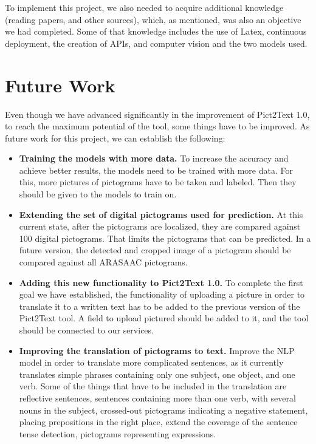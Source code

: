 To implement this project, we also needed to acquire additional knowledge (reading papers, and other sources), which, as mentioned, was also an objective we had completed. Some of that knowledge includes the use of Latex, continuous deployment, the creation of APIs, and computer vision and the two models used.

\section{Future Work}
\label{Future Work}

Even though we have advanced significantly in the improvement of Pict2Text 1.0, to reach the maximum potential of the tool, some things have to be improved. As future work for this project, we can establish the following:

\begin{itemize}
\item \textbf{Training the models with more data.} To increase the accuracy and achieve better results, the models need to be trained with more data. For this, more pictures of pictograms have to be taken and labeled. Then they should be given to the models to train on.
\item \textbf{Extending the set of digital pictograms used for prediction.} At this current state, after the pictograms are localized, they are compared against 100 digital pictograms. That limits the pictograms that can be predicted. In a future version, the detected and cropped image of a pictogram should be compared against all ARASAAC pictograms.
\item \textbf{Adding this new functionality to Pict2Text 1.0.} To complete the first goal we have established, the functionality of uploading a picture in order to translate it to a written text has to be added to the previous version of the Pict2Text tool. A field to upload pictured should be added to it, and the tool should be connected to our services.
\item \textbf{Improving the translation of pictograms to text.} Improve the NLP model in order to translate more complicated sentences, as it currently translates simple phrases containing only one subject, one object, and one verb. Some of the things that have to be included in the translation are reflective sentences, sentences containing more than one verb, with several nouns in the subject, crossed-out pictograms indicating a negative statement, placing prepositions in the right place, extend the coverage of the sentence tense detection, pictograms representing expressions.
\end{itemize}
